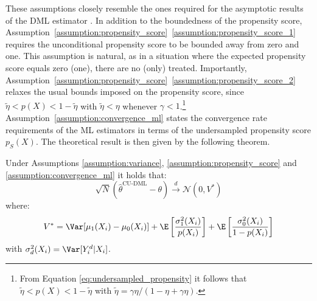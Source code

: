 
These assumptions closely resemble the ones required for the asymptotic results of the DML estimator \citep{Chernozhukov2018,Wager2022}. In addition to the boundedness of the propensity score, Assumption~\ref{assumption:propensity_score}~\ref{assumption:propensity_score_1} requires the unconditional propensity score to be bounded away from zero and one. This assumption is natural, as in a situation where the expected propensity score equals zero (one), there are no (only) treated. Importantly, Assumption~\ref{assumption:propensity_score}~\ref{assumption:propensity_score_2} relaxes the usual bounds imposed on the propensity score, since $\tilde\eta<p(X)<1-\tilde\eta$ with $\tilde\eta<\eta$ whenever $\gamma<1$.\footnote{From Equation \eqref{eq:undersampled_propensity} it follows that $\tilde\eta<p(X)<1-\tilde\eta$ with $\tilde\eta = \gamma\eta/(1-\eta+\gamma\eta)$.} Assumption~\ref{assumption:convergence_ml} states the convergence rate requirements of the ML estimators in terms of the undersampled propensity score $p_S(X)$. The theoretical result is then given by the following theorem.

\begin{theorem}
    \label{theorem:convergence}
    Under Assumptions \ref{assumption:variance}, \ref{assumption:propensity_score} and \ref{assumption:convergence_ml} it holds that:
    \begin{equation*}
        \sqrt{N} \left( \widehat{\theta}^{\text{CU-DML}} - \theta \right) \overset{d}{\longrightarrow} \mathcal{N}\left(0, V^*\right)
    \end{equation*}
    where:
    \begin{equation*}
        V^* = \Var[\mu_1(X_i)-\mu_0(X_i)] + \E\left[\frac{\sigma_1^2(X_i)}{p(X_i)}\right] + \E\left[\frac{\sigma_0^2(X_i)}{1-p(X_i)}\right]
    \end{equation*}
    with $\sigma^2_d(X_i) = \Var[Y_i^d\vert X_i]$.
\end{theorem}

